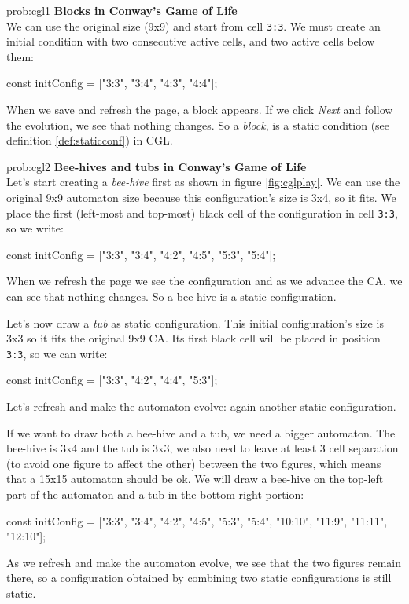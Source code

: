 \begin{sol}{prob:cgl1}
\textbf{Blocks in Conway's Game of Life}\\
We can use the original size (9x9) and start from cell \texttt{3:3}. We must create
an initial condition with two consecutive active cells, and two active cells below them:
\begin{code}
const initConfig = ["3:3", "3:4", "4:3", "4:4"];
\end{code}
When we save and refresh the page, a block appears. If we click \textit{Next} and follow the
evolution, we see that nothing changes. So a \textit{block}, is a static condition
(see definition \ref{def:staticconf}) in CGL.
\end{sol}

\begin{sol}{prob:cgl2}
\textbf{Bee-hives and tubs in Conway's Game of Life}\\
Let's start creating a \textit{bee-hive} first as shown in figure \ref{fig:cglplay}. We can use
the original 9x9 automaton size because this configuration's size is 3x4, so it fits.
We place the first (left-most and top-most) black cell of the configuration in cell \texttt{3:3},
so we write:
\begin{code}
const initConfig = ["3:3", "3:4", "4:2", "4:5", "5:3", "5:4"];
\end{code}
When we refresh the page we see the configuration and as we advance the CA, we can see that
nothing changes. So a bee-hive is a static configuration.

Let's now draw a \textit{tub} as static configuration.
This initial configuration's size is 3x3 so it fits the original 9x9 CA.
Its first black cell will be placed in position \texttt{3:3}, so we can write:
\begin{code}
const initConfig = ["3:3", "4:2", "4:4", "5:3"];
\end{code}
Let's refresh and make the automaton evolve: again another static configuration.

If we want to draw both a bee-hive and a tub, we need a bigger automaton. The bee-hive
is 3x4 and the tub is 3x3, we also need to leave at least 3 cell separation
(to avoid one figure to affect the other) between the two figures, which means that a
15x15 automaton should be ok. We will draw a bee-hive on the top-left part of the automaton
and a tub in the bottom-right portion:
\begin{code}
const initConfig = ["3:3", "3:4", "4:2", "4:5", "5:3", "5:4", "10:10", "11:9", "11:11", "12:10"];
\end{code}
As we refresh and make the automaton evolve, we see that the two figures remain there, so a
configuration obtained by combining two static configurations is still static.


\end{sol}
